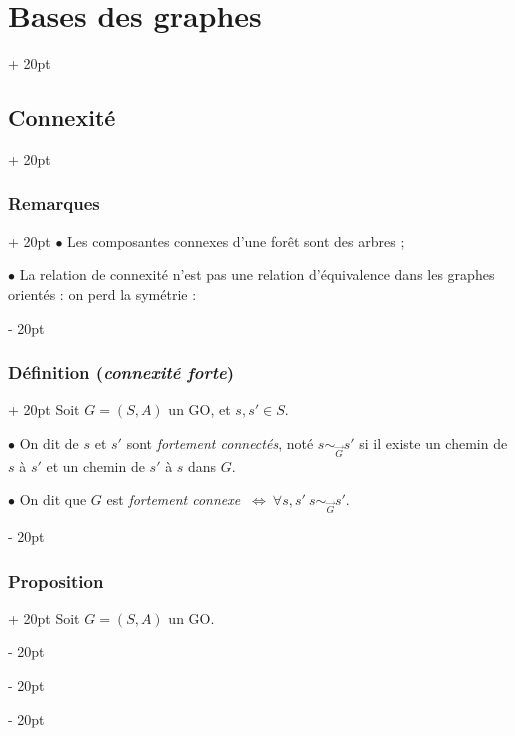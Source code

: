 \documentclass[a4paper, 12pt, twoside]{article}
\newcommand{\ssi}{\ \Leftrightarrow \ }
\newcommand{\ind}[1][20pt]{\advance\leftskip + #1}
\newcommand{\deind}[1][20pt]{\advance\leftskip - #1}
\newenvironment{indt}[2][20pt]{#2 \par \ind[#1]}{\par \deind} %
\begin{document}
\begin{indt}{\section{Bases des graphes}}
\begin{indt}{\subsection{Connexité}}
            \vspace{12pt}
            
            \begin{indt}{\subsubsection{Remarques}}
                $\bullet$ Les composantes connexes d'une forêt sont des arbres ;

                $\bullet$ La relation de connexité n'est pas une relation d'équivalence dans les graphes orientés : on perd la symétrie :

                \begin{center}
                \end{center}
            \end{indt}

            \vspace{12pt}
            
            \begin{indt}{\subsubsection{Définition (\textit{connexité forte})}}
                Soit $G = (S, A)$ un GO, et $s, s' \in S$.

                $\bullet$ On dit de $s$ et $s'$ sont \textit{fortement connectés}, noté $s \sim_{\vec G} s'$ si il existe un chemin de $s$ à $s'$ et un chemin de $s'$ à $s$ dans $G$.

                $\bullet$ On dit que $G$ est \textit{fortement connexe} $\ssi \forall s, s'\ s \sim_{\vec G} s'$.
            \end{indt}

            \vspace{12pt}
            
            \begin{indt}{\subsubsection{Proposition}}
                Soit $G = (S, A)$ un GO.


\end{indt}
\end{indt}
\end{indt}
\end{document}
